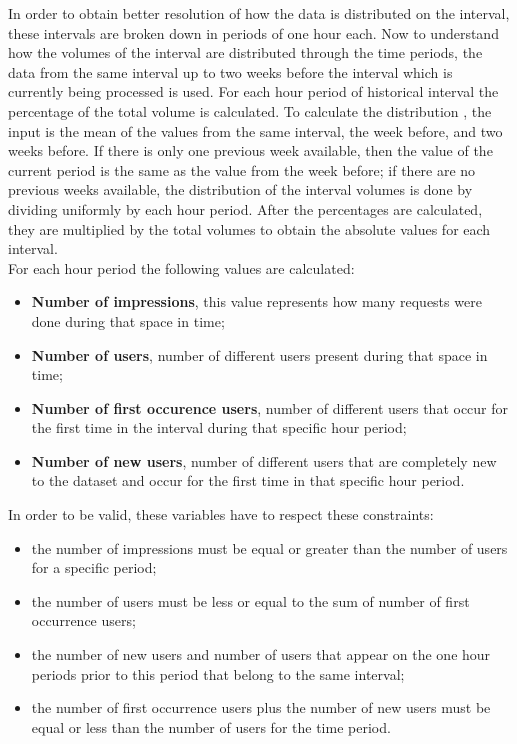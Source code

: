 In order to obtain better resolution of how the data is distributed on the
interval, these intervals are broken down in periods of one hour each. Now to
understand how the volumes of the interval are distributed through the time periods,
the data from the same interval up to two weeks before the interval which is
currently
being processed is used. For each hour period of historical interval the
percentage of the total volume is calculated.
To calculate the distribution , the input is the mean of the values from the
same interval, the week before, and two weeks before. If there is only one
previous week available, then the value of the current period is the same as the
value from the week before; if there are no previous weeks available, the
distribution of the interval volumes is done by dividing uniformly by each hour
period.
After the percentages are
calculated, they are multiplied by the total volumes to obtain the absolute
values for each interval.
\\
For each hour period the following values are calculated:
\begin{itemize}
  \item \textbf{Number of impressions}, this value represents how many requests
    were done during that space in time;
  \item \textbf{Number of users}, number of different users present during that
    space in time;
  \item \textbf{Number of first occurence users}, number of different users that
    occur for the first time in the interval during that specific hour period;
  \item \textbf{Number of new users}, number of different users that are
    completely new to the dataset and occur for the first time in that specific
    hour period.
\end{itemize}

In order to be valid, these variables have to respect these constraints:
\begin{itemize}
\item the number of impressions must be equal or greater than the number of
  users for a specific period;
\item the number of users must be less or equal to the sum of number of first
  occurrence users;
\item the number of new users and number of users that appear on the one hour
periods prior to this period that belong to the same interval;
\item the number of first occurrence users plus the number of new users must be
  equal or less than the number of users for the time period.
\end{itemize}

